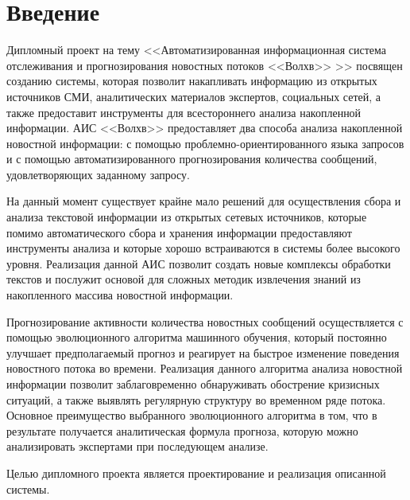 \section*{Введение}

Дипломный проект на тему <<Автоматизированная информационная система отслеживания и прогнозирования новостных потоков <<Волхв>> >> посвящен созданию системы, которая позволит накапливать информацию из открытых источников СМИ, аналитических материалов экспертов, социальных сетей, а также предоставит инструменты для всестороннего анализа накопленной информации. АИС <<Волхв>> предоставляет два способа анализа накопленной новостной информации: с помощью проблемно-ориентированного языка запросов и с помощью автоматизированного прогнозирования количества сообщений, удовлетворяющих заданному запросу.

На данный момент существует крайне мало решений для осуществления сбора и анализа текстовой информации из открытых сетевых источников, которые помимо автоматического сбора и хранения информации предоставляют инструменты анализа и которые хорошо встраиваются в системы более высокого уровня. Реализация данной АИС позволит создать новые комплексы обработки текстов и послужит основой для сложных методик извлечения знаний из накопленного массива новостной информации.

Прогнозирование активности количества новостных сообщений осуществляется с помощью эволюционного алгоритма машинного обучения, который постоянно улучшает предполагаемый прогноз и реагирует на быстрое изменение поведения новостного потока во времени. Реализация данного алгоритма анализа новостной информации позволит заблаговременно обнаруживать обострение кризисных ситуаций, а также выявлять регулярную структуру во временном ряде потока. Основное преимущество выбранного эволюционного алгоритма в том, что в результате получается аналитическая формула прогноза, которую можно анализировать экспертами при последующем анализе.

Целью дипломного проекта является проектирование и реализация описанной
системы.